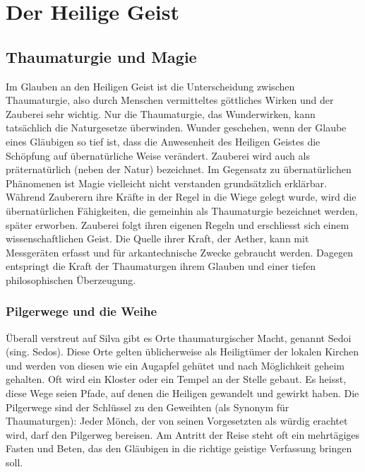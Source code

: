 \documentclass[10pt,twoside,twocolumn,openany]{book}
\begin{document}
\newpage \section{Der Heilige Geist}
\begin{multicols}{2}
	
	\subsection{Thaumaturgie und Magie}
	Im Glauben an den Heiligen Geist ist die Unterscheidung zwischen Thaumaturgie, also durch Menschen vermitteltes göttliches Wirken und der Zauberei sehr wichtig. Nur die Thaumaturgie, das Wunderwirken, kann tatsächlich die Naturgesetze überwinden. Wunder geschehen, wenn der Glaube eines Gläubigen so tief ist, dass die Anwesenheit des Heiligen Geistes die Schöpfung auf übernatürliche Weise verändert. Zauberei wird auch als präternatürlich (neben der Natur) bezeichnet. Im Gegensatz zu übernatürlichen Phänomenen ist Magie vielleicht nicht verstanden grundsätzlich erklärbar.
	Während Zauberern ihre Kräfte in der Regel in die Wiege gelegt wurde, wird die übernatürlichen Fähigkeiten, die gemeinhin als Thaumaturgie bezeichnet werden, später erworben. Zauberei folgt ihren eigenen Regeln und erschliesst sich einem wissenschaftlichen Geist. Die Quelle ihrer Kraft, der Aether, kann mit Messgeräten erfasst und für arkantechnische Zwecke gebraucht werden. Dagegen entspringt die Kraft der Thaumaturgen ihrem Glauben und einer tiefen philosophischen Überzeugung.
	
	\subsubsection{Pilgerwege und die Weihe}
	Überall verstreut auf Silva gibt es Orte thaumaturgischer Macht, genannt Sedoi (sing. Sedos). Diese Orte gelten üblicherweise als Heiligtümer der lokalen Kirchen und werden von diesen wie ein Augapfel gehütet und nach Möglichkeit geheim gehalten. Oft wird ein Kloster oder ein Tempel an der Stelle gebaut. Es heisst, diese Wege seien Pfade, auf denen die Heiligen gewandelt und gewirkt haben. Die Pilgerwege sind der Schlüssel zu den Geweihten (als Synonym für Thaumaturgen): Jeder Mönch, der von seinen Vorgesetzten als würdig erachtet wird, darf den Pilgerweg bereisen. Am Antritt der Reise steht oft ein mehrtägiges Fasten und Beten, das den Gläubigen in die richtige geistige Verfassung bringen soll.
	

\end{multicols}
\end{document}
